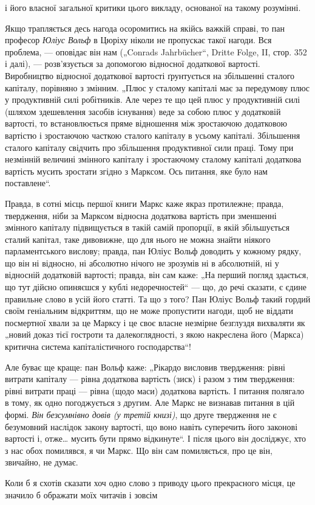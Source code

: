 \parcont{}  %
і його власної загальної критики цього викладу, основаної на
такому розумінні.

Якщо трапляється десь нагода осоромитись на якійсь важкій
справі, то пан професор \emph{Юліус Вольф} в Цюріху ніколи не пропускає
такої нагоди. Вся проблема, — оповідає він нам („Conrads
Jahrbücher“, Dritte Folge, II, стор. 352 і далі), — розв’язується за допомогою
відносної додаткової вартості. Виробництво відносної
додаткової вартості ґрунтується на збільшенні сталого капіталу,
порівняно з змінним. „Плюс у сталому капіталі має за передумову
плюс у продуктивній силі робітників. Але через те що цей
плюс у продуктивній силі (шляхом здешевлення засобів існування)
веде за собою плюс у додатковій вартості, то встановлюється
пряме відношення між зростаючою додатковою вартістю
і зростаючою часткою сталого капіталу в усьому капіталі.
Збільшення сталого капіталу свідчить про збільшення
продуктивної сили праці. Тому при незмінній величині змінного
капіталу і зростаючому сталому капіталі додаткова вартість
мусить зростати згідно з Марксом. Ось питання, яке було нам
поставлене“.

Правда, в сотні місць першої книги Маркс каже якраз протилежне;
правда, твердження, ніби за Марксом відносна додаткова
вартість при зменшенні змінного капіталу підвищується в такій
самій пропорції, в якій збільшується сталий капітал, таке дивовижне,
що для нього не можна знайти ніякого парламентського
вислову; правда, пан Юліус Вольф доводить у кожному рядку,
що він ні відносно, ні абсолютно нічого не зрозумів ні в абсолютній,
ні у відносній додатковій вартості; правда, він сам
каже: „На перший погляд здається, що тут дійсно опиняєшся
у кублі недоречностей“ — що, до речі сказати, є єдине правильне
слово в усій його статті. Та що з того? Пан Юліус
Вольф такий гордий своїм геніальним відкриттям, що не може
пропустити нагоди, щоб не віддати посмертної хвали за це
Марксу і це своє власне незмірне безглуздя вихваляти як „новий
доказ тієї гостроти та далекоглядності, з якою накреслена
його (Маркса) критична система капіталістичного господарства“!

Але буває ще краще: пан Вольф каже: „Рікардо висловив
твердження: рівні витрати капіталу — рівна додаткова вартість
(зиск) і разом з тим твердження: рівні витрати праці — рівна
(щодо маси) додаткова вартість. І питання полягало в тому,
як одно погоджується з другим. Але Маркс не визнавав питання
в цій формі. \emph{Він безсумнівно довів (у третій книзі)},
що друге твердження не є безумовний наслідок закону вартості,
що воно навіть суперечить його законові вартості і, отже\dots{}
мусить бути прямо відкинуте“. І після цього він досліджує, хто
з нас обох помилявся, я чи Маркс. Що він сам помиляється,
про це він, звичайно, не думає.

Коли б я схотів сказати хоч одно слово з приводу цього
прекрасного місця, це значило б ображати моїх читачів і зовсім
\parbreak{}  %
